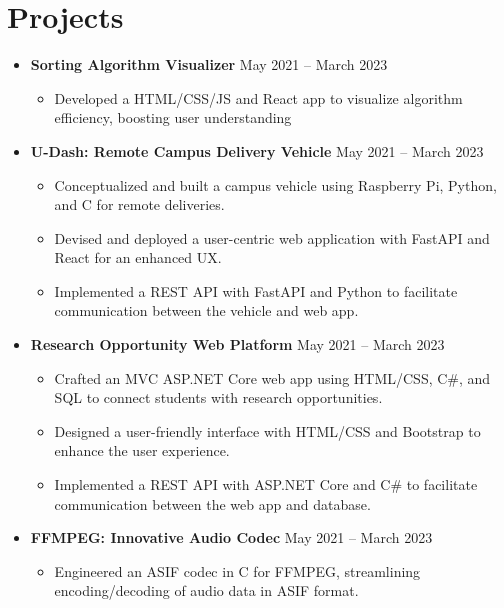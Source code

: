 \documentclass[letterpaper,1pt]{article}
\begin{document}
\section{\textbf{Projects}}
\begin{itemize}[leftmargin=0.15in, itemsep=0pt, parsep=0pt, label={}]
  \item{
              \textbf{Sorting Algorithm Visualizer} \hfill May 2021 -- March 2023 \\
              \begin{itemize}
                \item{Developed a HTML/CSS/JS and React app to visualize algorithm efficiency, boosting user understanding}
              \end{itemize}
        }
  \item{
              \textbf{U-Dash: Remote Campus Delivery Vehicle} \hfill May 2021 -- March 2023 \\
              \begin{itemize}
                \item{Conceptualized and built a campus vehicle using Raspberry Pi, Python, and C for remote deliveries.}
                \item{Devised and deployed a user-centric web application with FastAPI and React for an enhanced UX.}
                \item{Implemented a REST API with FastAPI and Python to facilitate communication between the vehicle and web app.}
              \end{itemize}
        }
  \item{
              \textbf{Research Opportunity Web Platform} \hfill May 2021 -- March 2023 \\
              \begin{itemize}
                \item{Crafted an MVC ASP.NET Core web app using HTML/CSS, C\#, and SQL to connect students with research opportunities.}
                \item{Designed a user-friendly interface with HTML/CSS and Bootstrap to enhance the user experience.}
                \item{Implemented a REST API with ASP.NET Core and C\# to facilitate communication between the web app and database.}
              \end{itemize}
        }
  \item{
              \textbf{FFMPEG: Innovative Audio Codec} \hfill May 2021 -- March 2023 \\
              \begin{itemize}
                \item{Engineered an ASIF codec in C for FFMPEG, streamlining encoding/decoding of audio data in ASIF format.}
              \end{itemize}
        }

\end{itemize}
\end{document}
